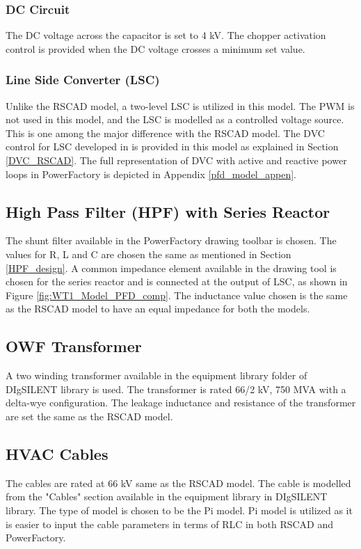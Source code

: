 \subsubsection{DC Circuit}
The \gls{DC} voltage across the capacitor is set to 4 kV. The chopper activation control is provided when the \gls{DC} voltage crosses a minimum set value. 

\subsubsection{Line Side Converter (LSC)}
Unlike the RSCAD model, a two-level \gls{LSC} is utilized in this model. The \gls{PWM} is not used in this model, and the \gls{LSC} is modelled as a controlled voltage source. This is one among the major difference with the RSCAD model. The \gls{DVC} control for \gls{LSC} developed in \cite{korai_dynamic_2019} is provided in this model as explained in Section \ref{DVC_RSCAD}. The full representation of \gls{DVC} with active and reactive power loops in PowerFactory is depicted in Appendix \ref{pfd_model_appen}. 

\subsection{High Pass Filter (HPF) with Series Reactor}
The shunt filter available in the PowerFactory drawing toolbar is chosen. The values for R, L and C are chosen the same as mentioned in Section \ref{HPF_design}. A common impedance element available in the drawing tool is chosen for the series reactor and is connected at the output of \gls{LSC}, as shown in Figure \ref{fig:WT1_Model_PFD_comp}. The inductance value chosen is the same as the RSCAD model to have an equal impedance for both the models.  

\subsection{OWF Transformer}
A two winding transformer available in the equipment library folder of DIgSILENT library is used. The transformer is rated 66/2 kV, 750 MVA with a delta-wye configuration. The leakage inductance and resistance of the transformer are set the same as the RSCAD model.

\subsection{HVAC Cables}
The cables are rated at 66 kV same as the RSCAD model. The cable is modelled from the "Cables" section available in the equipment library in DIgSILENT library. The type of model is chosen to be the Pi model. %
Pi model is utilized as it is easier to input the cable parameters in terms of RLC in both RSCAD and PowerFactory.

